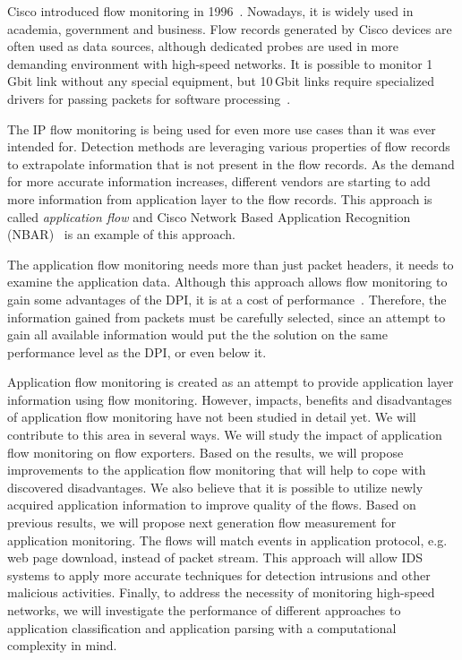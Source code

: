 Cisco introduced flow monitoring in 1996~\cite{netflow-year}. Nowadays, it is widely used in academia, government and business. Flow records generated by Cisco devices are often used as data sources, although dedicated probes are used in more demanding environment with high-speed networks. It is possible to monitor 1\,Gbit link without any special equipment, but 10\,Gbit links require specialized drivers for passing packets for software processing~\cite{Iannaccone:2001:MVH:505202.505235}.

The IP flow monitoring is being used for even more use cases than it was ever intended for. Detection methods are leveraging various properties of flow records to extrapolate information that is not present in the flow records. As the demand for more accurate information increases, different vendors are starting to add more information from application layer to the flow records. This approach is called \emph{application flow} and Cisco Network Based Application Recognition (NBAR)~\cite{cisco-nbar} is an example of this approach.

The application flow monitoring needs more than just packet headers, it needs to examine the application data. Although this approach allows flow monitoring to gain some advantages of the DPI, it is at a cost of performance~\cite{1120462}. Therefore, the information gained from packets must be carefully selected, since an attempt to gain all available information would put the the solution on the same performance level as the DPI, or even below it.

Application flow monitoring is created as an attempt to provide application layer information using flow monitoring. However, impacts, benefits and disadvantages of application flow monitoring have not been studied in detail yet. We will contribute to this area in several ways. We will study the impact of application flow monitoring on flow exporters. Based on the results, we will propose improvements to the application flow monitoring that will help to cope with discovered disadvantages. We also believe that it is possible to utilize newly acquired application information to improve quality of the flows. Based on previous results, we will propose next generation flow measurement for application monitoring. The flows will match events in application protocol, e.g. web page download, instead of packet stream. This approach will allow IDS systems to apply more accurate techniques for detection intrusions and other malicious activities. Finally, to address the necessity of monitoring high-speed networks, we will investigate the performance of different approaches to application classification and application parsing with a computational complexity in mind.

